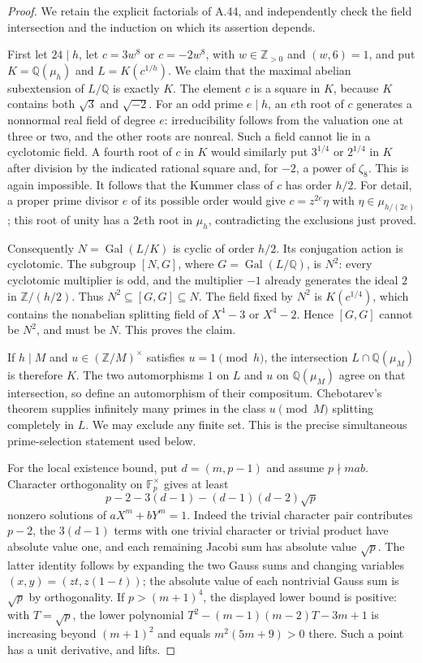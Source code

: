 \begin{proof}
We retain the explicit factorials of A.44, and independently check the
field intersection and the induction on which its assertion depends.

First let $24\mid h$, let $c=3w^8$ or $c=-2w^8$, with
$w\in\mathbb Z_{>0}$ and $(w,6)=1$, and put
$K=\mathbb Q(\mu_h)$ and $L=K(c^{1/h})$. We claim that the maximal
abelian subextension of $L/\mathbb Q$ is exactly $K$.
The element $c$ is a square in $K$, because $K$ contains both
$\sqrt3$ and $\sqrt{-2}$. For an odd prime $e\mid h$, an $e$th root
of $c$ generates a nonnormal real field of degree $e$: irreducibility
follows from the valuation one at three or two, and the other roots are
nonreal. Such a field cannot lie in a cyclotomic field. A fourth root
of $c$ in $K$ would similarly put $3^{1/4}$ or $2^{1/4}$ in $K$ after
division by the indicated rational square and, for $-2$, a power of
$\zeta_8$. This is again impossible. It follows that the Kummer class
of $c$ has order $h/2$. For detail, a proper prime divisor $e$ of its
possible order would give $c=z^{2e}\eta$ with
$\eta\in\mu_{h/(2e)}$; this root of unity has a $2e$th root in
$\mu_h$, contradicting the exclusions just proved.

Consequently $N=\operatorname{Gal}(L/K)$ is cyclic of order $h/2$.
Its conjugation action is cyclotomic. The subgroup $[N,G]$, where
$G=\operatorname{Gal}(L/\mathbb Q)$, is $N^2$: every cyclotomic
multiplier is odd, and the multiplier $-1$ already generates the ideal
$2$ in $\mathbb Z/(h/2)$. Thus
$N^2\subseteq[G,G]\subseteq N$. The field fixed by $N^2$ is
$K(c^{1/4})$, which contains the nonabelian splitting field of
$X^4-3$ or $X^4-2$. Hence $[G,G]$ cannot be $N^2$, and must be $N$.
This proves the claim.

If $h\mid M$ and $u\in(\mathbb Z/M)^\times$ satisfies
$u=1\pmod h$, the intersection
$L\cap\mathbb Q(\mu_M)$ is therefore $K$.
The two automorphisms $1$ on $L$ and $u$ on $\mathbb Q(\mu_M)$ agree
on that intersection, so define an automorphism of their compositum.
Chebotarev's theorem \citep[Theorem 8.31, p.~147]{MilneANT2020} supplies
infinitely many primes in the class $u\pmod M$ splitting completely
in $L$. We may exclude any finite set. This is the precise simultaneous
prime-selection statement used below.

For the local existence bound, put $d=(m,p-1)$ and assume $p\nmid mab$.
Character orthogonality on $\mathbb F_p^\times$ gives at least
\[
p-2-3(d-1)-(d-1)(d-2)\sqrt p
\]
nonzero solutions of $aX^m+bY^m=1$. Indeed the trivial character pair
contributes $p-2$, the $3(d-1)$ terms with one trivial character or
trivial product have absolute value one, and each remaining Jacobi sum
has absolute value $\sqrt p$. The latter identity follows by expanding
the two Gauss sums and changing variables $(x,y)=(zt,z(1-t))$; the
absolute value of each nontrivial Gauss sum is $\sqrt p$ by
orthogonality. If $p>(m+1)^4$, the displayed lower bound is positive:
with $T=\sqrt p$, the lower polynomial
$T^2-(m-1)(m-2)T-3m+1$ is increasing beyond $(m+1)^2$ and equals
$m^2(5m+9)>0$ there. Such a point has a unit derivative, and lifts.


\end{proof}

